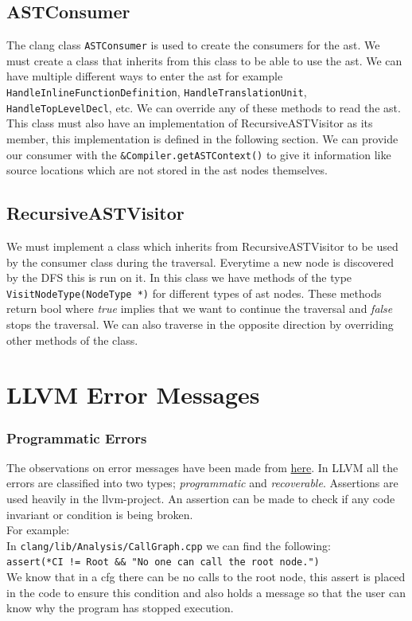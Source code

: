 \documentclass[12pt]{article}
\newcommand{\code}{\texttt}
\begin{document}
\subsection{ASTConsumer}
The clang class \code{ASTConsumer} is used to create the consumers for the ast. We must create a class that inherits from this class to be able to use the ast. We can have multiple different ways to enter the ast for example \code{HandleInlineFunctionDefinition}, \code{HandleTranslationUnit}, \code{HandleTopLevelDecl}, etc. We can override any of these methods to read the ast. This class must also have an implementation of RecursiveASTVisitor as its member, this implementation is defined in the following section. We can provide our consumer with the \code{\&Compiler.getASTContext()} to give it information like source locations which are not stored in the ast nodes themselves.
\subsection{RecursiveASTVisitor}
We must implement a class which inherits from RecursiveASTVisitor to be used by the consumer class during the traversal. Everytime a new node is discovered by the DFS this is run on it. In this class we have methods of the type \code{VisitNodeType(NodeType *)} for different types of ast nodes. These methods return bool where \textit{true} implies that we want to continue the traversal and \textit{false} stops the traversal. We can also traverse in the opposite direction by overriding other methods of the class.
\newpage
\section{LLVM Error Messages}
\subsubsection{Programmatic Errors}
The observations on error messages have been made from \href{http://llvm.org/docs/ProgrammersManual.html}{here}.
In LLVM all the errors are classified into two types; \textit{programmatic} and \textit{recoverable}. Assertions are used heavily in the llvm-project. An assertion can be made to check if any code invariant or condition is being broken.\\
For example:\\
In \code{clang/lib/Analysis/CallGraph.cpp} we can find the following:\\
\hspace*{5ex} \code{assert(*CI != Root \&\& "No one can call the root node.")}
\\ We know that in a cfg there can be no calls to the root node, this assert is placed in the code to ensure this condition and also holds a message so that the user can know why the program has stopped execution.
\end{document}
